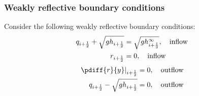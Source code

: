 \subsubsection{Weakly reflective boundary conditions}
Consider the following weakly reflective boundary conditions:
\begin{align}
    q_{i+\frac{1}{2}} + \sqrt{gh_{i+\frac{1}{2}}} &= \sqrt{gh^\infty_{i+\frac{1}{2}}}, \quad \text{inflow}
    \\
    r_{i+\frac{1}{2}} &= 0, \quad \text{inflow}
\end{align}
\begin{align}
    \left.\pdiff{r}{y}\right|_{i+\half} &= 0, \quad \text{outflow}
    \\
    q_{i+\half} - \sqrt{gh_{i+\half}} & = 0, \quad \text{outflow}
\end{align}